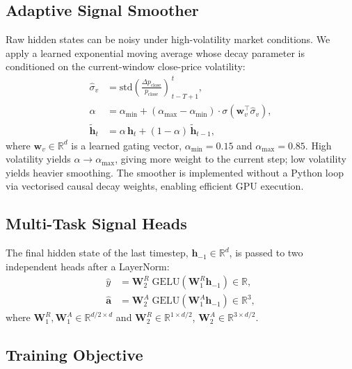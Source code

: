 \documentclass[runningheads]{llncs}
\begin{document}
\subsection{Adaptive Signal Smoother}
\label{sec:smoother}

Raw hidden states can be noisy under high-volatility market conditions.
We apply a learned exponential moving average whose decay parameter is
conditioned on the current-window close-price volatility:
\begin{align}
  \hat{\sigma}_v &= \text{std}\!\left(
    \frac{\Delta p_{\text{close}}}{p_{\text{close}}}
  \right)_{\,t-T+1}^{\,t}, \label{eq:vol} \\
  \alpha &= \alpha_{\min} + (\alpha_{\max} - \alpha_{\min})
            \cdot \sigma\!\left(\mathbf{w}_v^\top \hat{\sigma}_v\right),
            \label{eq:alpha} \\
  \tilde{\mathbf{h}}_t &= \alpha \, \mathbf{h}_t
                         + (1 - \alpha)\, \tilde{\mathbf{h}}_{t-1},
  \label{eq:ema}
\end{align}
where $\mathbf{w}_v \in \mathbb{R}^d$ is a learned gating vector,
$\alpha_{\min}{=}0.15$ and $\alpha_{\max}{=}0.85$.  High volatility yields
$\alpha \to \alpha_{\max}$, giving more weight to the current step;
low volatility yields heavier smoothing.  The smoother is implemented without
a Python loop via vectorised causal decay weights, enabling efficient
GPU execution.

\subsection{Multi-Task Signal Heads}
\label{sec:heads}

The final hidden state of the last timestep, $\mathbf{h}_{-1} \in \mathbb{R}^d$,
is passed to two independent heads after a LayerNorm:
\begin{align}
  \hat{y} &= \mathbf{W}_2^R \;\text{GELU}(\mathbf{W}_1^R \mathbf{h}_{-1})
             \in \mathbb{R},
             \label{eq:reghead} \\
  \hat{\mathbf{a}} &= \mathbf{W}_2^A \;\text{GELU}(\mathbf{W}_1^A \mathbf{h}_{-1})
                    \in \mathbb{R}^3,
             \label{eq:actionhead}
\end{align}
where $\mathbf{W}_1^R, \mathbf{W}_1^A \in \mathbb{R}^{d/2 \times d}$ and
$\mathbf{W}_2^R \in \mathbb{R}^{1 \times d/2}$,
$\mathbf{W}_2^A \in \mathbb{R}^{3 \times d/2}$.

\subsection{Training Objective}
\label{sec:loss}
\end{document}

